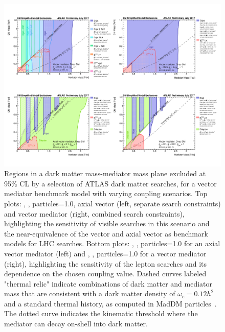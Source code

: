 \begin{figure}[!htpb]
\includegraphics[width=\textwidth]{figures/SummaryPlotsMassMass.pdf}\caption{
Regions in a dark matter mass-mediator mass plane excluded at 95\% CL by a selection of ATLAS dark matter searches, for a vector mediator benchmark model with varying coupling scenarios. Top plots: , , \ginvisible particles=1.0, axial vector (left, separate search constraints) and vector mediator (right, combined search constraints), highlighting the sensitivity of visible searches in this scenario and the near-equivalence of the vector and axial vector as benchmark models for LHC searches. Bottom plots: , , \ginvisible particles=1.0 for an axial vector mediator (left) and , , \ginvisible particles=1.0 for a vector mediator (right), highlighting the sensitivity of the lepton searches and its dependence on the chosen coupling value. Dashed curves labeled "thermal relic" indicate combinations of dark matter and mediator mass that are consistent with a dark matter density of $\omega_c = 0.12 h^2$ and a standard thermal history, as computed in MadDM particles~\cite{Backovic:2015cra}. The dotted curve indicates the kinematic threshold where the mediator can decay on-shell into dark matter. }
\label{fig:sensitivityComparison}
\end{figure}

